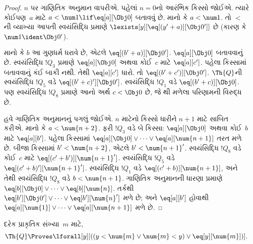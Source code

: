 \documentclass[../../../include/open-logic-section]{subfiles}
\begin{document}
\begin{proof}
$n$ પર ગાણિતિક અનુમાન વાપરીએ.
પહેલાં $n = 0$નો આરંભિક
કિસ્સો જોઈએ. ત્યારે કોઈપણ~$a$
માટે $a < \num 1 \lif
\eq[a][\Obj 0]$ બતાવવું છે.
માનો કે $a < \num 1$. તો
$<$ની વ્યાખ્યા આપતી સ્વયંસિદ્ધિ
પ્રમાણે
$\lexists[y][\eq[(y'+a)][\Obj 0']]$
છે (કારણ કે $\num 1 \ident
\Obj 0'$).

માનો કે $b$ આ ગુણધર્મ
ધરાવે છે, એટલે
$\eq[(b'+a)][\Obj 0']$.
$\eq[a][\Obj 0]$ બતાવવાનું છે.
સ્વયંસિદ્ધિ $!Q_3$ પ્રમાણે
$\eq[a][\Obj 0]$ અથવા
કોઈ~$c$ માટે $\eq[a][c']$.
પહેલા કિસ્સામાં બતાવવાનું કંઈ
બાકી નથી. તેથી
$\eq[a][c']$ ધારો. તો
$\eq[(b' + c')][\Obj 0']$.
$\Th{Q}$ની સ્વયંસિદ્ધિ $!Q_5$
વડે $\eq[(b'+c)'][\Obj 0']$.
સ્વયંસિદ્ધિ $!Q_1$ વડે
$\eq[(b' + c)][\Obj 0]$.
પણ સ્વયંસિદ્ધિ $!Q_8$ પ્રમાણે
આનો અર્થ $c < \Obj 0$ છે,
જે થી
મળેલા પરિણામની વિરુદ્ધ છે.

હવે ગાણિતિક અનુમાનનું પગલું જોઈએ.
$n$ માટેનો કિસ્સો ધારીને
$n+1$ માટે સાબિત કરીએ.
માનો કે $a < \num {n+2}$.
ફરી $!Q_3$ વડે બે કિસ્સા:
$\eq[a][\Obj 0]$ અથવા
કોઈ~$b$ માટે $\eq[a][b']$.
પહેલા કિસ્સામાં
$\eq[a][\Obj 0] \lor \dots \lor
\eq[a][\num{n+1}]$ તરત મળે છે.
બીજા કિસ્સામાં
$b' < \num {n+2}$, એટલે
$b' < \num{n+1}'$.
સ્વયંસિદ્ધિ $!Q_8$ વડે કોઈ~$c$
માટે
$\eq[(c'+b')][\num{n+1}']$.
સ્વયંસિદ્ધિ $!Q_5$ વડે
$\eq[(c'+b)'][\num{n+1}']$.
સ્વયંસિદ્ધિ $!Q_1$ વડે
$\eq[(c'+b)][\num{n+1}]$,
અને તેથી સ્વયંસિદ્ધિ $!Q_8$
વડે $b < \num{n+1}$.
ગાણિતિક અનુમાનની ધારણા પ્રમાણે
$\eq[b][\Obj 0] \lor \dots \lor
\eq[b][\num{n}]$. તર્કથી
$\eq[b'][\Obj 0'] \lor \dots \lor
\eq[b'][\num{n}']$ મળે છે;
અને $\eq[a][b']$ હોવાથી
$\eq[a][\num{1}] \lor \dots \lor
\eq[a][\num{n+1}]$ મળે છે.
\end{proof}

\begin{lem}
   દરેક પ્રાકૃતિક સંખ્યા~$m$ માટે,
  \[
  \Th{Q} \Proves
  \lforall[y][((y < \num{m} \lor \num{m} < y) \lor \eq[y][\num{m}])].
  \]
\end{lem}
\end{document}
